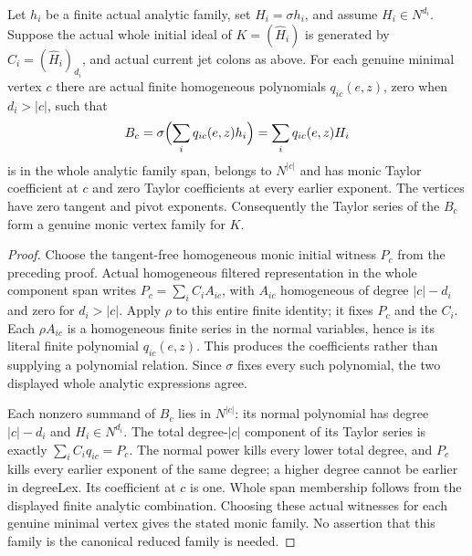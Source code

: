 \begin{theorem}
\label{hir:actual-tangent-scaling-analytic-image-witnesses}
\leanok
Let $h_i$ be a finite actual analytic family, set $H_i=\sigma h_i$, and
assume $H_i\in N^{d_i}$. Suppose the actual whole initial ideal of
$K=(\widehat H_i)$ is generated by $C_i=(\widehat H_i)_{d_i}$, and actual current jet colons as above. For each genuine minimal vertex
$c$ there are actual finite homogeneous polynomials $q_{ic}(e,z)$, zero
when $d_i>|c|$, such that
\[
 B_c=\sigma\Bigl(\sum_i q_{ic}(e,z)h_i\Bigr)
      =\sum_i q_{ic}(e,z)H_i
\]
is in the whole analytic family span, belongs to $N^{|c|}$ and has monic
Taylor coefficient at $c$ and zero Taylor coefficients at every earlier
exponent. The vertices have zero tangent and pivot exponents. Consequently
the Taylor series of the $B_c$ form a genuine monic vertex family for $K$.
\end{theorem}
\begin{proof}
Choose the tangent-free homogeneous monic initial witness $P_c$ from the
preceding proof. Actual homogeneous filtered representation in the whole
component span writes $P_c=\sum_i C_i A_{ic}$, with $A_{ic}$ homogeneous
of degree $|c|-d_i$ and zero for $d_i>|c|$. Apply $\rho$ to this entire
finite identity; it fixes $P_c$ and the $C_i$. Each $\rho A_{ic}$ is a
homogeneous finite series in the normal variables, hence is its literal
finite polynomial $q_{ic}(e,z)$. This produces the coefficients rather
than supplying a polynomial relation. Since $\sigma$ fixes every such
polynomial, the two displayed whole analytic expressions agree.

Each nonzero summand of $B_c$ lies in $N^{|c|}$: its normal polynomial
has degree $|c|-d_i$ and $H_i\in N^{d_i}$. The total degree-$|c|$
component of its Taylor series is exactly $\sum_i C_iq_{ic}=P_c$.
The normal power kills every lower total degree, and $P_c$ kills every
earlier exponent of the same degree; a higher degree cannot be earlier
in degreeLex. Its coefficient at $c$ is one. Whole span membership follows
from the displayed finite analytic combination. Choosing these actual
witnesses for each genuine minimal vertex gives the stated monic family.
No assertion that this family is the canonical reduced family is needed.
\end{proof}

